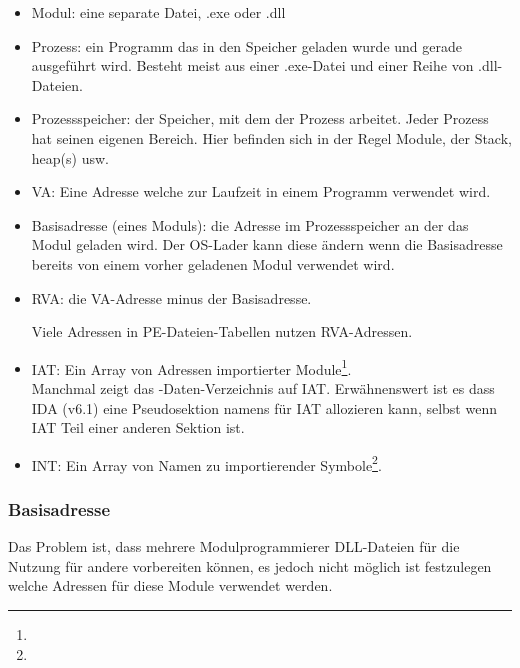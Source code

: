 \begin{itemize}
\item Modul: eine separate Datei, .exe oder .dll

\item Prozess: ein Programm das in den Speicher geladen wurde und gerade ausgeführt
wird. Besteht meist aus einer .exe-Datei und einer Reihe von .dll-Dateien.

\item Prozessspeicher: der Speicher, mit dem der Prozess arbeitet. Jeder Prozess
hat seinen eigenen Bereich. Hier befinden sich in der Regel Module, der Stack,
\gls{heap}(s) usw.

\item \ac{VA}: Eine Adresse welche zur Laufzeit in einem Programm verwendet wird.

\item Basisadresse (eines Moduls): die Adresse im Prozessspeicher an der das Modul
geladen wird. Der \ac{OS}-Lader kann diese ändern wenn die Basisadresse bereits
von einem vorher geladenen Modul verwendet wird.

\item \ac{RVA}: die \ac{VA}-Adresse minus der Basisadresse.

Viele Adressen in PE-Dateien-Tabellen nutzen \ac{RVA}-Adressen.


\item \ac{IAT}: Ein Array von Adressen importierter Module\footnote{\PietrekPE}.\\
Manchmal zeigt das -Daten-Verzeichnis auf \ac{IAT}.
\label{IDA_idata}
Erwähnenswert ist es dass \ac{IDA} (v6.1) eine Pseudosektion namens 
für \ac{IAT} allozieren kann, selbst wenn \ac{IAT} Teil einer anderen Sektion ist.

\item \ac{INT}: Ein Array von Namen zu importierender Symbole\footnote{\PietrekPE}.
\end{itemize}

\subsubsection{Basisadresse}

Das Problem ist, dass mehrere Modulprogrammierer DLL-Dateien für die Nutzung für andere
vorbereiten können, es jedoch nicht möglich ist festzulegen welche Adressen für diese
Module verwendet werden.

